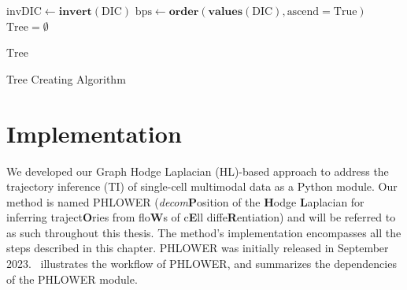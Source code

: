 \begin{algorithm}
    $\text{invDIC} \gets \textbf{invert}(\text{DIC})$ 
    $\text{bps} \gets \textbf{order}(\textbf{values}(\text{DIC}), \text{ascend}=\text{True})$ 
    $\text{Tree} = \emptyset$\\

    \Return $\text{Tree}$
    \caption{Tree Creating Algorithm}
    \label{alg:treecreating}
\end{algorithm}


\section{Implementation}
\label{TI_methods:implementation}
We developed our Graph Hodge Laplacian (HL)-based approach to address the trajectory inference (TI) of single-cell multimodal data as a Python module. Our method is named PHLOWER (\textit{decom}\textbf{P}osition of the \textbf{H}odge \textbf{L}aplacian for inferring traject\textbf{O}ries from flo\textbf{W}s of c\textbf{E}ll diffe\textbf{R}entiation) and will be referred to as such throughout this thesis. The method's implementation encompasses all the steps described in this chapter. PHLOWER was initially released in September 2023.~ illustrates the workflow of PHLOWER, and  summarizes the dependencies of the PHLOWER module.


